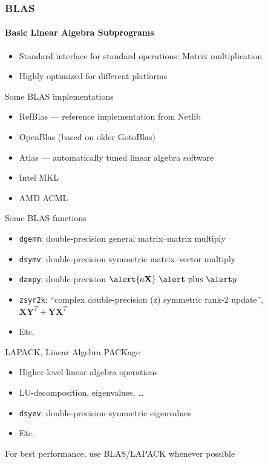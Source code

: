 \documentclass[usenames,dvipsnames,mathserif,compress]{beamer}
\begin{document}
\begin{frame}
  \frametitle{BLAS}
  \framesubtitle{Basic Linear Algebra Subprograms}
  \begin{itemize}
  \item Standard interface for standard operations:
    Matrix multiplication
  \item Highly optimized for different platforms
  \end{itemize}
  \begin{block}{Some BLAS implementations}
    \begin{itemize}
    \item RefBlas --- reference implementation from Netlib
    \item OpenBlas (based on older GotoBlas)
    \item Atlas --- automatically tuned linear algebra software
    \item Intel MKL
    \item AMD ACML
    \end{itemize}
  \end{block}
\end{frame}

\begin{frame}
  \begin{block}{Some BLAS functions}
    \begin{itemize}
    \item \texttt{dgemm}: \alert double-precision \alert{ge}neral \alert matrix--\alert matrix multiply
    \item \texttt{dsymv}: \alert double-precision \alert{sy}mmetric \alert matrix--\alert vector multiply
    \item \texttt{daxpy}: double-precision $\alert{a \mathbf X}\textrm{ \alert plus } \alert y$
    \item \texttt{zsyr2k}: ``complex double-precision (\alert z) \alert{sy}mmetric \alert ran\alert{k-2} update'',
      $\mathbf X \mathbf Y^T + \mathbf Y \mathbf X^T$
    \item Etc.
    \end{itemize}
  \end{block}
  \begin{block}{LAPACK, Linear Algebra PACKage}
    \begin{itemize}
    \item Higher-level linear algebra operations
    \item LU-decomposition, eigenvalues, \ldots
    \item \texttt{dsyev}: \alert double-precision \alert{sy}mmetric \alert eigen{\alert v}alues
    \item Etc.
    \end{itemize}
  \end{block}
  For best performance, use BLAS/LAPACK whenever possible
\end{frame}
\end{document}
